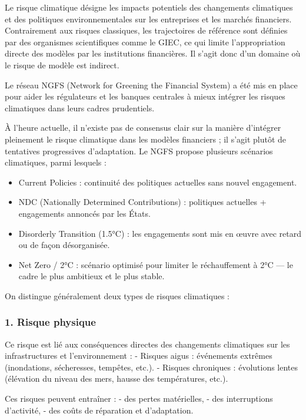 \documentclass[
  letterpaper,
  DIV=11,
  numbers=noendperiod]{scrartcl}
\providecommand{\tightlist}{%
  \setlength{\itemsep}{0pt}\setlength{\parskip}{0pt}}\usepackage{longtable,booktabs,array}
\begin{document}
Le risque climatique désigne les impacts potentiels des changements
climatiques et des politiques environnementales sur les entreprises et
les marchés financiers. Contrairement aux risques classiques, les
trajectoires de référence sont définies par des organismes scientifiques
comme le GIEC, ce qui limite l'appropriation directe des modèles par les
institutions financières. Il s'agit donc d'un domaine où le risque de
modèle est indirect.

Le réseau NGFS (Network for Greening the Financial System) a été mis en
place pour aider les régulateurs et les banques centrales à mieux
intégrer les risques climatiques dans leurs cadres prudentiels.

À l'heure actuelle, il n'existe pas de consensus clair sur la manière
d'intégrer pleinement le risque climatique dans les modèles financiers ;
il s'agit plutôt de tentatives progressives d'adaptation. Le NGFS
propose plusieurs scénarios climatiques, parmi lesquels :

\begin{itemize}
\tightlist
\item
  Current Policies : continuité des politiques actuelles sans nouvel
  engagement.
\item
  NDC (Nationally Determined Contributions) : politiques actuelles +
  engagements annoncés par les États.
\item
  Disorderly Transition (1.5°C) : les engagements sont mis en œuvre avec
  retard ou de façon désorganisée.
\item
  Net Zero / 2°C : scénario optimisé pour limiter le réchauffement à 2°C
  --- le cadre le plus ambitieux et le plus stable.
\end{itemize}

On distingue généralement deux types de risques climatiques :

\subsubsection{1. Risque physique}\label{risque-physique}

Ce risque est lié aux conséquences directes des changements climatiques
sur les infrastructures et l'environnement : - Risques aigus :
événements extrêmes (inondations, sécheresses, tempêtes, etc.). -
Risques chroniques : évolutions lentes (élévation du niveau des mers,
hausse des températures, etc.).

Ces risques peuvent entraîner : - des pertes matérielles, - des
interruptions d'activité, - des coûts de réparation et d'adaptation.
\end{document}
